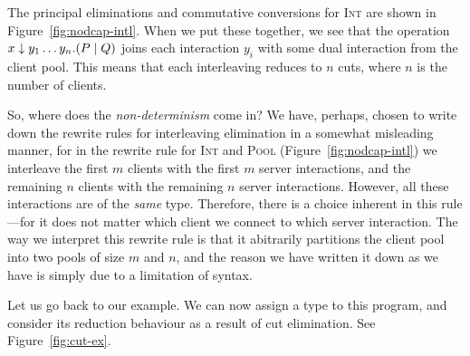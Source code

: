 \documentclass[a4paper,UKenglish]{lipics-v2016}
\begin{document}
The principal eliminations and commutative conversions for \textsc{Int} are
shown in Figure~\ref{fig:nodcap-intl}. When we put these together, we see that
the operation ${x \downarrow y_1 \dots y_n.}(P \mid Q)$ joins each interaction $y_i$
with some dual interaction from the client pool. This means that each
interleaving reduces to $n$ cuts, where $n$ is the number of clients. 
% 


So, where does the \emph{non-determinism} come in? We have, perhaps, chosen to
write down the rewrite rules for interleaving elimination in a somewhat
misleading manner, for in the rewrite rule for \textsc{Int} and \textsc{Pool}
(Figure~\ref{fig:nodcap-intl}) we interleave the first $m$ clients with the
first $m$ server interactions, and the remaining $n$ clients with the remaining
$n$ server interactions. However, all these interactions are of the \emph{same}
type. Therefore, there is a choice inherent in this rule---for it does not
matter which client we connect to which server interaction.
The way we interpret this rewrite rule is that it abitrarily partitions the
client pool into two pools of size $m$ and $n$, and the reason we have written
it down as we have is simply due to a limitation of syntax.

Let us go back to our example. We can now assign a type to this program, and
consider its reduction behaviour as a result of cut elimination. See
Figure~\ref{fig:cut-ex}.
\end{document}
